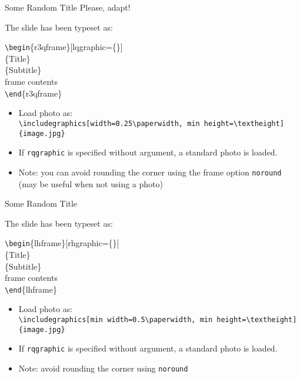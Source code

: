 \documentclass[aspectratio=1610]{beamer}
\newcommand*\command[1]{{\tt \textbackslash #1}}
\newcommand*\ind[1][2ex]{\hspace*{#1}}
\newcommand*\bframe[1][]{\command{begin}\{#1frame\}}
\newcommand*\eframe[1][]{\command{end}\{#1frame\}}
\begin{document}
\begin{r3qframe}[lqgraphic,t]
  {Some Random Title}
  {Please, adapt!}

  \small
  The slide has been typeset as:\\
  \begin{codesnippet}[\textwidth]
    \bframe[r3q][lqgraphic=\{<load photo here>\}]\\
    \ind\{Title\}\\
    \ind\{Subtitle\}\\
    \ind frame contents\\
    \eframe[r3q]
  \end{codesnippet}
  \smallskip

  \begin{itemize}
  \item   Load photo as:\\
    \command{includegraphics[width=0.25\command{paperwidth}, min height=\command{textheight}]
      \{image.jpg\}}
  \item If \texttt{rqgraphic} is specified without argument, a standard photo
    is loaded.
  \item Note: you can avoid rounding the corner using the
    frame option \texttt{noround} (may be useful when not using a photo)
  \end{itemize}
\end{r3qframe}

\begin{lhframe}[rhgraphic]
  {Some Random Title}

  \small
  The slide has been typeset as:\\
  \begin{codesnippet}[\textwidth]
    \bframe[lh][rhgraphic=\{<load photo here>\}]\\
    \ind\{Title\}\\
    \ind\{Subtitle\}\\
    \ind frame contents\\
    \eframe[lh]
  \end{codesnippet}
  \smallskip

  \begin{itemize}
  \item   Load photo as:\\
    \command{includegraphics[min
      width=0.5\command{paperwidth}, min height=\command{textheight}]
      \{image.jpg\}}
  \item If \texttt{rqgraphic} is specified without argument, a standard photo
    is loaded.
  \item Note: avoid rounding the corner using \texttt{noround}
  \end{itemize}
\end{lhframe}
\end{document}
